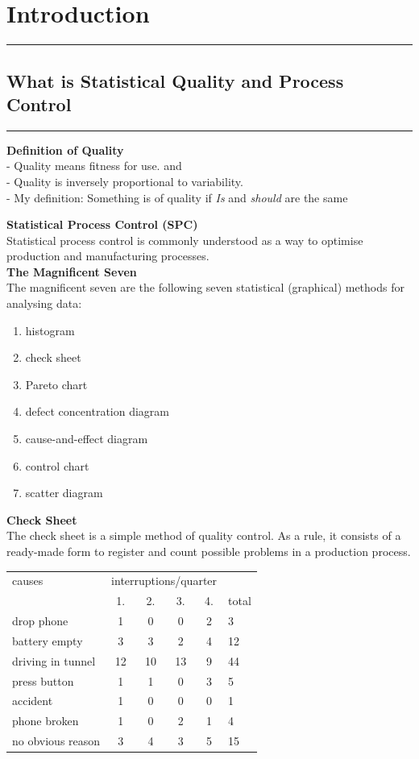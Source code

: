 \section{Introduction}
\noindent\rule[\linienAbstand]{\linewidth}{\linienDickeDick}

\subsection{What is Statistical Quality and Process Control}
\noindent\rule[\linienAbstand]{\linewidth}{\linienDicke}
\textbf{Definition of Quality}\\
- Quality means fitness for use. and\\
- Quality is inversely proportional to variability.\\
- My definition: Something is of quality if \emph{Is} and \emph{should} are the same


\textbf{Statistical Process Control (SPC)}\\
Statistical process control is commonly understood as a way to optimise production and manufacturing processes.\\

\textbf{The Magnificent Seven}\\
The magnificent seven are the following seven statistical (graphical) methods for analysing data:
\begin{enumerate}
  \item histogram
  \item check sheet
  \item Pareto chart
  \item defect concentration diagram
  \item cause-and-effect diagram
  \item control chart
  \item scatter diagram
\end{enumerate}

\textbf{Check Sheet}\\
The check sheet is a simple method of quality control. As a rule, it consists of a ready-made form to register and count possible problems in a production process.\\
\begin{table}[H]
  \scriptsize
  \centering
  \begin{tabular}{l|cccc|l}
    causes            & \multicolumn{4}{l|}{interruptions/quarter} &  \\
                      & 1. & 2. & 3. & 4. & total \\ \hline
    drop phone        & 1  & 0  & 0 & 2  & 3\\
    battery empty     & 3  & 3  & 2 & 4  & 12\\
    driving in tunnel & 12 & 10 & 13 & 9 & 44\\
    press button      & 1  & 1  & 0  & 3 & 5\\
    accident          & 1  & 0  & 0  & 0 & 1\\
    phone broken      & 1  & 0  & 2  & 1 & 4\\
    no obvious reason & 3  & 4  & 3  & 5 & 15
  \end{tabular}
\end{table}

